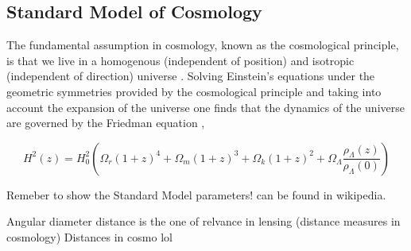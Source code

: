 
\subsection{Standard Model of Cosmology}

The fundamental assumption in cosmology, known as the cosmological principle, is that we live in a homogenous (independent of position) and isotropic (independent of direction) universe \cite{general_2013,ryden}. Solving Einstein's equations under the geometric symmetries provided by the cosmological principle and taking into account the expansion of the universe one finds that the dynamics of the universe are governed by the Friedman equation \cite{ryden,general_2013},

\begin{equation}
  H^2(z) = H_0^2 \left(\Omega_r (1+z)^4 + \Omega_m (1+z)^3 + \Omega_k (1+z)^2 + \Omega_\Lambda \frac{\rho_\Lambda(z)}{\rho_\Lambda(0)}\right)
  \label{eq:friedman}
\end{equation}


Remeber to show the Standard Model parameters! can be found in wikipedia.
\par Angular diameter distance is the one of relvance in lensing (distance measures in cosmology)
Distances in cosmo \cite{Hogg:1999ad}
lol 

